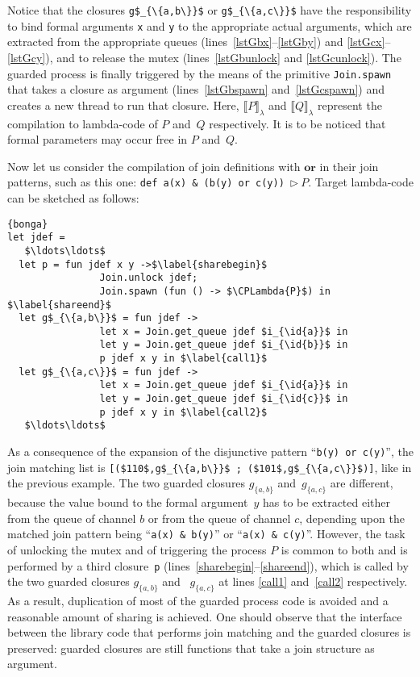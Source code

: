 \documentclass{LMCS}
\let \lst \lstinline
\newcommand{\kwd}[1]{\ensuremath{\mathbf{#1}}}
\newcommand{\id}[1]{\textit{#1}}
\renewcommand{\_}{\mathord{\rule[-.25ex]{1ex}{.15ex}}}
\newcommand{\CPLambda}[1]{\llbracket#1\rrbracket_{\lambda}}
\begin{document}
Notice that the closures \lst|g$_{\{a,b\}}$| or \lst|g$_{\{a,c\}}$|
have the responsibility to bind formal arguments \lst|x| and \lst|y|
to the
appropriate actual arguments, which are extracted from the appropriate
queues (lines~\ref{lstGbx}--\ref{lstGby}) and
\ref{lstGcx}--\ref{lstGcy}), and to release the mutex
(lines~\ref{lstGbunlock} and \ref{lstGcunlock}).
The guarded process is finally triggered by the means of
the primitive \lst|Join.spawn| that takes a closure as argument
(lines~\ref{lstGbspawn} and~\ref{lstGcspawn}) and creates a new thread
to run that closure.
Here,  $\CPLambda{P}$ and $\CPLambda{Q}$ represent the
compilation to lambda-code of $P$ and~$Q$ respectively.
It is to be noticed that formal parameters may occur free in
$P$ and~$Q$.

Now let us consider the compilation of join definitions with \kwd{or}
in their join patterns, such as this one:
\lst|def a(x) & (b(y) or c(y))|~$\triangleright~P$.
Target lambda-code  can be sketched as follows:
\begin{lstlisting}[indent=1.8em,labelstep=1]{bonga}
let jdef = 
   $\ldots\ldots$
  let p = fun jdef x y ->$\label{sharebegin}$
                Join.unlock jdef;
                Join.spawn (fun () -> $\CPLambda{P}$) in $\label{shareend}$
  let g$_{\{a,b\}}$ = fun jdef ->
                let x = Join.get_queue jdef $i_{\id{a}}$ in
                let y = Join.get_queue jdef $i_{\id{b}}$ in
                p jdef x y in $\label{call1}$
  let g$_{\{a,c\}}$ = fun jdef ->
                let x = Join.get_queue jdef $i_{\id{a}}$ in
                let y = Join.get_queue jdef $i_{\id{c}}$ in
                p jdef x y in $\label{call2}$
   $\ldots\ldots$
\end{lstlisting}
As a consequence of the expansion of the disjunctive pattern
``\lst"b(y) or c(y)"'', the join matching list is
\lst|[($110$,g$_{\{a,b\}}$ ; ($101$,g$_{\{a,c\}}$)]|, like in the
previous example. The two guarded closures $\id{g}_{\{a,b\}}$
and~$\id{g}_{\{a,c\}}$ are different, because the value bound to the
formal argument~$\id{y}$ has to be extracted either from the queue of
channel $\id{b}$ or from the queue of channel $\id{c}$, depending upon
the matched join pattern being ``\lst!a(x) & b(y)!'' or ``\lst!a(x) & c(y)!''.
However, the task of unlocking the mutex and of triggering
the process $P$ is common to both and is performed by a third
closure~\lst|p| (lines~\ref{sharebegin}--\ref{shareend}), which is
called by the two guarded closures $\id{g}_{\{a,b\}}$ and~
$\id{g}_{\{a,c\}}$ at lines \ref{call1} and~\ref{call2} respectively.
As a result, duplication of most of the guarded process code is
avoided and a reasonable amount of sharing is achieved.  One should
observe that the interface between the library code that performs join
matching and the guarded closures is preserved: guarded closures are
still functions that take a join structure as argument.
\end{document}
